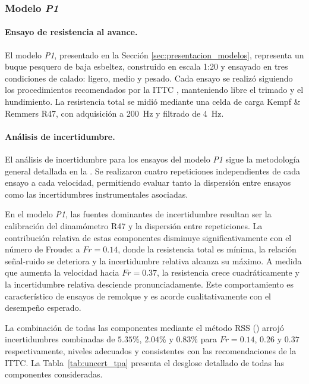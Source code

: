 \vspace{1em}

\subsubsection{Modelo \textit{P1}}

\paragraph{Ensayo de resistencia al avance.}

El modelo \textit{P1}, presentado en la Sección \ref{sec:presentacion_modelos}, representa un buque pesquero de baja esbeltez, construido en escala 1:20 y ensayado en tres condiciones de calado: ligero, medio y pesado.
Cada ensayo se realizó siguiendo los procedimientos recomendados por la ITTC \citep{ITTC_resistance}, manteniendo libre el trimado y el hundimiento.
La resistencia total se midió mediante una celda de carga Kempf \& Remmers R47, con adquisición a 200~Hz y filtrado de 4~Hz.

\paragraph{Análisis de incertidumbre.}

El análisis de incertidumbre para los ensayos del modelo \textit{P1} sigue la metodología general detallada en la . Se realizaron cuatro repeticiones independientes de cada ensayo a cada velocidad, permitiendo evaluar tanto la dispersión entre ensayos como las incertidumbres instrumentales asociadas.

En el modelo \textit{P1}, las fuentes dominantes de incertidumbre resultan ser la calibración del dinamómetro R47 y la dispersión entre repeticiones. La contribución relativa de estas componentes disminuye significativamente con el número de Froude: a $Fr = 0{.}14$, donde la resistencia total es mínima, la relación señal-ruido se deteriora y la incertidumbre relativa alcanza su máximo. A medida que aumenta la velocidad hacia $Fr = 0{.}37$, la resistencia crece cuadráticamente y la incertidumbre relativa desciende pronunciadamente. Este comportamiento es característico de ensayos de remolque y es acorde cualitativamente con el desempeño esperado.

La combinación de todas las componentes mediante el método RSS () arrojó incertidumbres combinadas de $5{.}35\%$, $2{.}04\%$ y $0{.}83\%$ para $Fr = 0{.}14$, $0{.}26$ y $0{.}37$ respectivamente, niveles adecuados y consistentes con las recomendaciones de la ITTC. La Tabla~\ref{tab:uncert_tpa} presenta el desglose detallado de todas las componentes consideradas.

